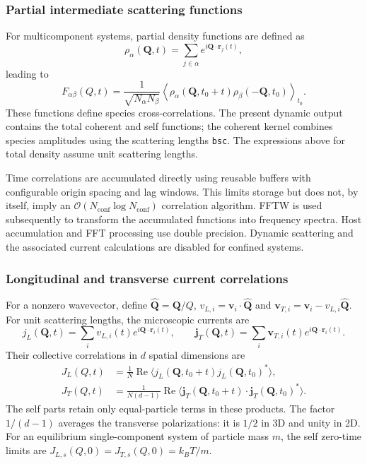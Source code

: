 \documentclass[final,1p,times]{elsarticle}
\begin{document}
\subsubsection{Partial intermediate scattering functions}
For multicomponent systems, partial density functions are defined as
\[
\rho_\alpha(\mathbf{Q},t)= \sum_{j\in\alpha} e^{i\mathbf{Q}\cdot\mathbf{r}_j(t)},
\]
leading to
\[
F_{\alpha\beta}(Q,t)= \frac{1}{\sqrt{N_\alpha N_\beta}} \left\langle \rho_\alpha(\mathbf{Q},t_0+t) \rho_\beta(-\mathbf{Q},t_0) \right\rangle_{t_0}.
\]
These functions define species cross-correlations. The present dynamic
output contains the total coherent and self functions; the coherent
kernel combines species amplitudes using the scattering lengths
\texttt{bsc}. The expressions above for total density assume unit
scattering lengths.

Time correlations are accumulated directly using reusable buffers with
configurable origin spacing and lag windows. This limits storage but
does not, by itself, imply an
$\mathcal O(N_{\mathrm{conf}}\log N_{\mathrm{conf}})$ correlation
algorithm. FFTW\cite{Frigo2008FFTW3} is used subsequently to transform
the accumulated functions into frequency spectra. Host accumulation
and FFT processing use double precision. Dynamic scattering and the
associated current calculations are disabled for confined systems.

\subsubsection{Longitudinal and transverse current correlations}
For a nonzero wavevector, define $\hat{\mathbf Q}=\mathbf Q/Q$,
$v_{L,i}=\mathbf v_i\cdot\hat{\mathbf Q}$ and
$\mathbf v_{T,i}=\mathbf v_i-v_{L,i}\hat{\mathbf Q}$. For unit
scattering lengths, the microscopic currents are
\begin{equation}
j_L(\mathbf Q,t)=\sum_i v_{L,i}(t)e^{i\mathbf Q\cdot\mathbf r_i(t)},
\qquad
\mathbf j_T(\mathbf Q,t)=\sum_i\mathbf v_{T,i}(t)
e^{i\mathbf Q\cdot\mathbf r_i(t)}.
\end{equation}
Their collective correlations in $d$ spatial dimensions are
\begin{align}
J_L(Q,t)&=\frac{1}{N}\operatorname{Re}
\langle j_L(\mathbf Q,t_0+t)j_L(\mathbf Q,t_0)^*\rangle,\\
J_T(Q,t)&=\frac{1}{N(d-1)}\operatorname{Re}
\langle\mathbf j_T(\mathbf Q,t_0+t)\cdot
\mathbf j_T(\mathbf Q,t_0)^*\rangle.
\end{align}
The self parts retain only equal-particle terms in these products.
The factor $1/(d-1)$ averages the transverse polarizations: it is
$1/2$ in 3D and unity in 2D. For an equilibrium single-component
system of particle mass $m$, the self zero-time limits are
$J_{L,s}(Q,0)=J_{T,s}(Q,0)=k_BT/m$.
\end{document}
